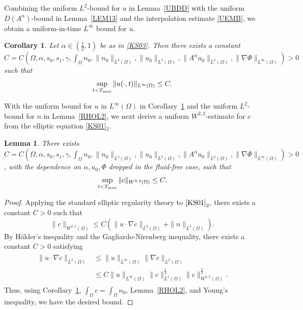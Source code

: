 \documentclass{amsart}
\newtheorem{lemma}[defn]{Lemma}
\newtheorem{cor}[defn]{Corollary}
\numberwithin{equation}{section}
\begin{document}
Combining the uniform $L^2$-bound for $u$ in Lemma~\ref{UBDD} with the uniform $D(A^\alpha)$-bound in Lemma~\ref{LEM13}
and the interpolation estimate \eqref{UEMB}, we obtain a uniform-in-time $L^\infty$ bound for $u$.


\begin{cor}\label{UINFCOR}
Let $\alpha\in(\frac12,1)$ be as in \eqref{KS03}.
Then there exists a constant \\
$C=C (\Omega,\alpha, s_0, s_1, \gamma, \int_\Omega n_0,\|n_0\|_{L^2(\Omega)}, \|u_0\|_{L^2(\Omega)},\|A^\alpha u_0\|_{L^2(\Omega)},\|\nabla\Phi\|_{L^\infty(\Omega)})>0$ such that
\[
\sup_{t<T_{\rm max}}   \|  u(\cdot,t)\|_{L^{\infty}(\Omega)}  \le C.
\]
\end{cor}

With the uniform bound for $u$ in $L^\infty(\Omega)$ in Corollary~\ref{UINFCOR} and the uniform $L^2$-bound for $n$ in Lemma~\ref{RHOL2},
we next derive a uniform $W^{2,2}$-estimate for $c$ from the elliptic equation \eqref{KS01}$_2$.


\begin{lemma}\label{CBDD}
There exists $C=C (\Omega,\alpha, s_0, s_1, \gamma, \int_\Omega n_0,\|n_0\|_{L^2(\Omega)}, \|u_0\|_{L^2(\Omega)},\|A^\alpha u_0\|_{L^2(\Omega)},\|\nabla\Phi\|_{L^\infty(\Omega)})>0$, with the dependence on $\alpha, u_0,\Phi$ dropped in the fluid-free case, such that
\[
\sup_{t<T_{\rm max}}\|c\|_{W^{2,2}(\Omega)}\le C.
\]
\end{lemma}

\begin{proof}
Applying the standard elliptic regularity theory to $\eqref{KS01}_{2}$, there exists a constant $C>0$ such that
\[
\|c\|_{W^{2,2}(\Omega)}\le C( \|u\cdot \nabla c\|_{L^{2}(\Omega)}+ \|n\|_{L^{2}(\Omega)}).
\]
By H\"older's inequality and the Gagliardo-Nirenberg inequality, there exists a constant $C>0$ satisfying
\begin{align*}
\begin{aligned}
\|u\cdot \nabla c\|_{L^{2}(\Omega)}&\le \|u \|_{L^{\infty}(\Omega)} \|  \nabla c\|_{L^{2}(\Omega)}
\\& \le C\|u \|_{L^{\infty}(\Omega)} \|    c\|_{L^{1}(\Omega)}^{\frac{1}{3}} \|    c\|_{W^{2,2}(\Omega)}^{\frac{2}{3}}.
\end{aligned}
\end{align*}
Thus, using Corollary~\ref{UINFCOR}, $ \int_{\Omega} c = \int_{\Omega} n_0$, 
Lemma~\ref{RHOL2}, and Young's inequality, we have the desired bound.
\end{proof}
\end{document}
